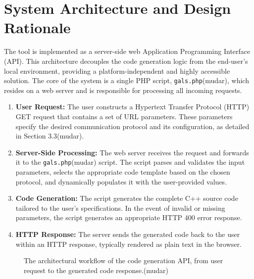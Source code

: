 
\section{System Architecture and Design Rationale}
\label{sec:architecture}

The tool is implemented as a server-side web Application Programming Interface (API). This architecture decouples the code generation logic from the end-user's local environment, providing a platform-independent and highly accessible solution. The core of the system is a single PHP script, \texttt{gals.php}(mudar), which resides on a web server and is responsible for processing all incoming requests.



\begin{enumerate}
    \item \textbf{User Request:} The user constructs a Hypertext Transfer Protocol (HTTP) GET request that contains a set of URL parameters. These parameters specify the desired communication protocol and its configuration, as detailed in Section 3.3(mudar).
    \item \textbf{Server-Side Processing:} The web server receives the request and forwards it to the \texttt{gals.php}(mudar) script. The script parses and validates the input parameters, selects the appropriate code template based on the chosen protocol, and dynamically populates it with the user-provided values.
    \item \textbf{Code Generation:} The script generates the complete C++ source code tailored to the user's specifications. In the event of invalid or missing parameters, the script generates an appropriate HTTP 400 error response.
    \item \textbf{HTTP Response:} The server sends the generated code back to the user within an HTTP response, typically rendered as plain text in the browser.
\end{enumerate}

\begin{figure}[h!]
    \centering
    
    \caption{The architectural workflow of the code generation API, from user request to the generated code response.(mudar)}
    \label{fig:api_workflow}
\end{figure}

